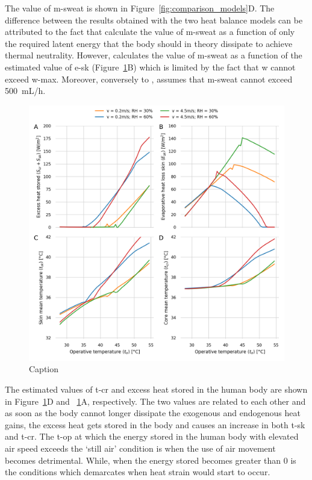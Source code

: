 The value of \ac{m-sweat} is shown in Figure~\ref{fig:comparison_models}D\@.
The difference between the results obtained with the two heat balance models can be attributed to the fact that \citeauthor{Jay2015} calculate the value of \ac{m-sweat} as a function of only the required latent energy that the body should in theory dissipate to achieve thermal neutrality.
However, \citeauthor{GaggeSET} calculates the value of \ac{m-sweat} as a function of the estimated value of \ac{e-sk} (Figure~\ref{fig:results_model_2}B) which is limited by the fact that \ac{w} cannot exceed \ac{w-max}.
Moreover, conversely to \citeauthor{Jay2015}, \citeauthor{GaggeSET} assumes that \ac{m-sweat} cannot exceed 500~mL/h.

\begin{figure}[b!]
    \centering
    \includegraphics[width=\textwidth]{figures/results_model_2.png}
    \caption{Caption}
    \label{fig:results_model_2}
\end{figure}

The estimated values of \ac{t-cr} and excess heat stored in the human body are shown in Figure~\ref{fig:results_model_2}D and ~\ref{fig:results_model_2}A, respectively.
The two values are related to each other and as soon as the body cannot longer dissipate the exogenous and endogenous heat gains, the excess heat gets stored in the body and causes an increase in both \ac{t-sk} and \ac{t-cr}.
The \ac{t-op} at which the energy stored in the human body with elevated air speed exceeds the `still air' condition is when the use of air movement becomes detrimental.
While, when the energy stored becomes greater than 0 is the conditions which demarcates when heat strain would start to occur.

